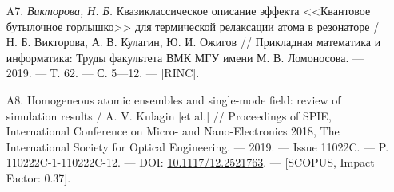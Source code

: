 {\begin{itemize}[leftmargin=24pt]
	\item[A7.]{\textit{Викторова, Н. Б.} Квазиклассическое описание эффекта <<Квантовое бутылочное горлышко>> для термической релаксации атома в резона­торе / Н. Б. Викторова, А. В. Кулагин, Ю. И. Ожигов // Прикладная математика и информатика: Труды факультета ВМК МГУ имени М. В. Ломоносова. — 2019. — Т. 62. — С. 5—12. — [RINC].}
	\item[A8.]{Homogeneous atomic ensembles and single-mode field: review of simulation results / A. V. Kulagin [et al.] // Proceedings of SPIE, International Conference on Micro- and Nano-Electronics 2018, The International Society for Optical Engineering. — 2019. — Issue 11022C. — P. 110222C-1-110222C-12. — DOI: \href{http://dx.doi.org/10.1117/12.2521763}{10.1117/12.2521763}. — [SCOPUS, Impact Factor: 0.37].}
\end{itemize}
}

